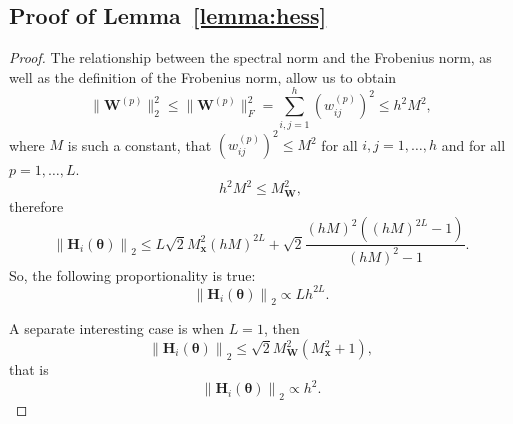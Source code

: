 \documentclass{article}
\begin{document}
\subsection{Proof of Lemma~\ref{lemma:hess}}\label{app:lemma:hess}
\begin{proof}
    The relationship between the spectral norm and the Frobenius norm, as well as the definition of the Frobenius norm, allow us to obtain
    \[ \| \mathbf{W}^{(p)} \|_2^2 \leqslant \| \mathbf{W}^{(p)} \|_F^2 = \sum_{i, j = 1}^{h} \left(w_{ij}^{(p)}\right)^2 \leqslant h^2 M^2, \]
    where $M$ is such a constant, that $\left(w_{ij}^{(p)}\right)^2 \leqslant  M^2$ for all $i, j = 1, \ldots, h$ and for all $p = 1, \ldots, L$.
    \[ h^2 M^2 \leqslant M_{\mathbf{W}}^2, \]
    therefore
    \[ \left\| \mathbf{H}_i(\boldsymbol{\theta}) \right\|_2 \leqslant L \sqrt{2} M_{\mathbf{x}}^2 (hM)^{2L} + \sqrt{2} \dfrac{(hM)^2 ((hM)^{2L} - 1)}{(hM)^2 - 1}. \]
    So, the following proportionality is true:
    \[ \left\| \mathbf{H}_i(\boldsymbol{\theta}) \right\|_2 \propto L h^{2L}. \]
    
    A separate interesting case is when $L = 1$, then
    \[ \left\| \mathbf{H}_i(\boldsymbol{\theta}) \right\|_2 \leqslant \sqrt{2} M_{\mathbf{W}}^{2} \left( M_{\mathbf{x}}^2 + 1 \right), \]
    that is
    \[ \left\| \mathbf{H}_i(\boldsymbol{\theta}) \right\|_2 \propto h^2. \]
\end{proof}
\end{document}
